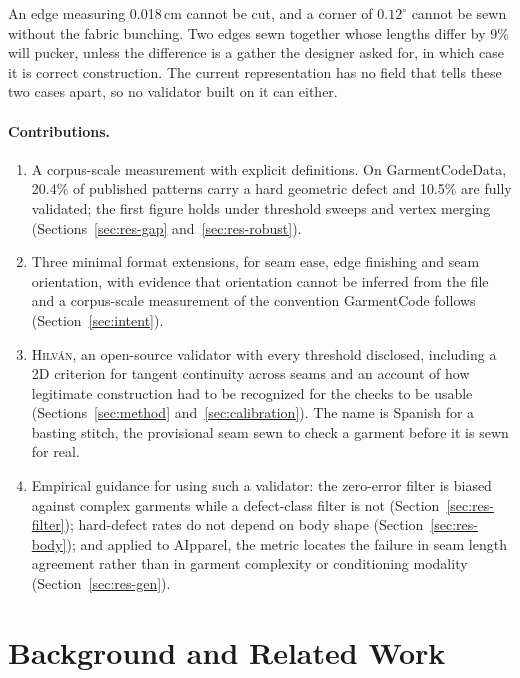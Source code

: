 \documentclass[10pt,twocolumn]{article}
\newcommand{\hilvan}{\textsc{Hilv\'an}}
\begin{document}
An edge measuring 0.018\,cm cannot be cut, and a corner of $0.12^\circ$ cannot
be sewn without the fabric bunching. Two edges sewn together whose lengths
differ by 9\% will pucker, unless the difference is a gather the designer asked
for, in which case it is correct construction. The current representation has
no field that tells these two cases apart, so no validator built on it can
either.

\paragraph{Contributions.}
\begin{enumerate}\itemsep1pt
  \item A corpus-scale measurement with explicit definitions. On
  GarmentCodeData, 20.4\% of published patterns carry a hard geometric defect
  and 10.5\% are fully validated; the first figure holds under threshold sweeps
  and vertex merging (Sections~\ref{sec:res-gap} and~\ref{sec:res-robust}).
  \item Three minimal format extensions, for seam ease, edge finishing and seam
  orientation, with evidence that orientation cannot be inferred from the file
  and a corpus-scale measurement of the convention GarmentCode follows
  (Section~\ref{sec:intent}).
  \item \hilvan, an open-source validator with every threshold disclosed,
  including a 2D criterion for tangent continuity across seams and an account
  of how legitimate construction had to be recognized for the checks to be
  usable (Sections~\ref{sec:method} and~\ref{sec:calibration}). The name is
  Spanish for a basting stitch, the provisional seam sewn to check a garment
  before it is sewn for real.
  \item Empirical guidance for using such a validator: the zero-error filter is
  biased against complex garments while a defect-class filter is not
  (Section~\ref{sec:res-filter}); hard-defect rates do not depend on body shape
  (Section~\ref{sec:res-body}); and applied to AIpparel, the metric locates the
  failure in seam length agreement rather than in garment complexity or
  conditioning modality (Section~\ref{sec:res-gen}).
\end{enumerate}

\section{Background and Related Work}
\end{document}

